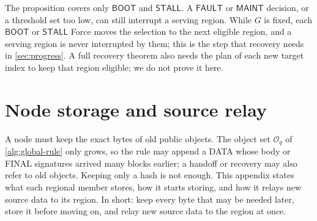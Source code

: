 \documentclass[11pt,a4paper]{article}
\newcommand{\tagg}[1]{\ensuremath{\mathsf{#1}}}
\begin{document}
The proposition covers only \tagg{BOOT} and \tagg{STALL}. A \tagg{FAULT}
or \tagg{MAINT} decision, or a threshold set too low, can still
interrupt a serving region. While $G$ is fixed, each \tagg{BOOT} or
\tagg{STALL} Force moves the selection to the next eligible region, and
a serving region is never interrupted by them; this is the step that
recovery needs in \cref{sec:progress}. A full recovery theorem also needs
the plan of each new target index to keep that region eligible; we
do not prove it here.

\section{Node storage and source relay}
\label{app:storage}
\label{sec:source-step}
\label{sec:source-retention}
A node must keep the exact bytes of old public objects. The object set
$\mathcal O_q$ of \cref{alg:global-rule} only grows, so the rule may
append a DATA whose body or FINAL signatures arrived many blocks
earlier; a handoff or recovery may also refer to old objects. Keeping
only a hash is not enough. This appendix states what each regional
member stores, how it starts storing, and how it relays new source data
to its region. In short: keep every byte that may be needed later, store
it before moving on, and relay new source data to the region at once.
\end{document}
